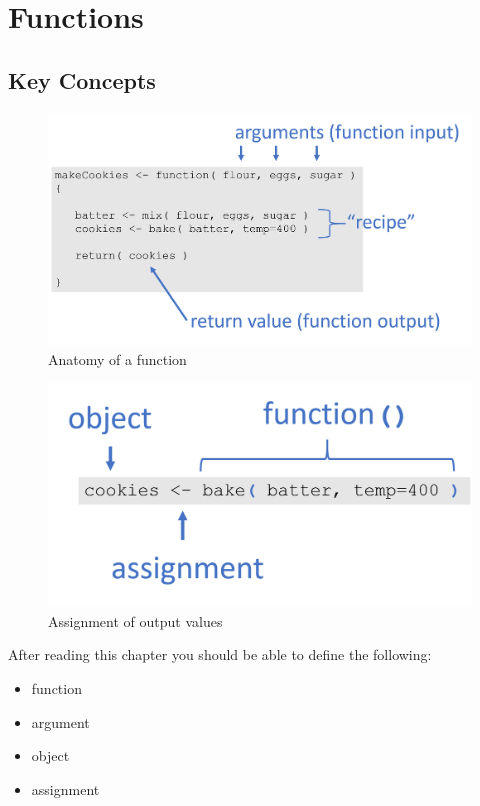\documentclass[]{book}
\providecommand{\tightlist}{%
  \setlength{\itemsep}{0pt}\setlength{\parskip}{0pt}}
\theoremstyle{definition}
\theoremstyle{definition}
\theoremstyle{definition}
\theoremstyle{remark}
\begin{document}
\hypertarget{functions}{%
\chapter{Functions}\label{functions}}

\hypertarget{key-concepts}{%
\section{Key Concepts}\label{key-concepts}}

\begin{figure}

{\centering \includegraphics[width=0.7\linewidth]{figures/function} 

}

\caption{Anatomy of a function}\label{fig:unnamed-chunk-27}
\end{figure}

\begin{figure}

{\centering \includegraphics[width=0.7\linewidth]{figures/assignment} 

}

\caption{Assignment of output values}\label{fig:unnamed-chunk-28}
\end{figure}

After reading this chapter you should be able to define the following:

\begin{itemize}
\tightlist
\item
  function
\item
  argument
\item
  object
\item
  assignment
\end{itemize}
\end{document}
